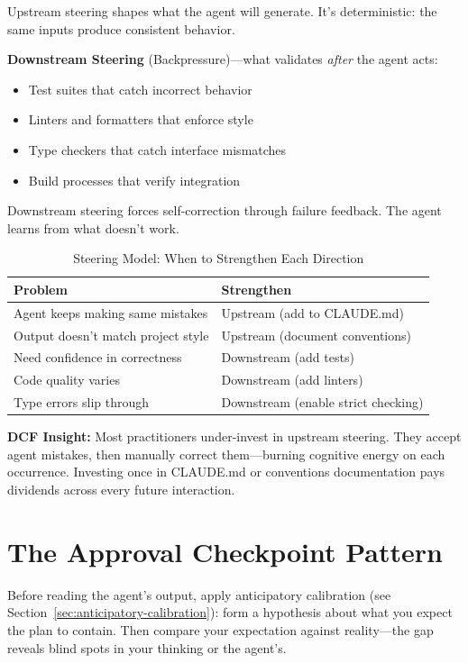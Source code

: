 Upstream steering shapes what the agent will generate. It's deterministic: the same inputs produce consistent behavior.

\textbf{Downstream Steering} (Backpressure)---what validates \emph{after} the agent acts:
\begin{itemize}
    \item Test suites that catch incorrect behavior
    \item Linters and formatters that enforce style
    \item Type checkers that catch interface mismatches
    \item Build processes that verify integration
\end{itemize}

Downstream steering forces self-correction through failure feedback. The agent learns from what doesn't work.

\begin{table}[H]
\centering
\begin{tabular}{ll}
\toprule
\textbf{Problem} & \textbf{Strengthen} \\
\midrule
Agent keeps making same mistakes & Upstream (add to CLAUDE.md) \\
Output doesn't match project style & Upstream (document conventions) \\
Need confidence in correctness & Downstream (add tests) \\
Code quality varies & Downstream (add linters) \\
Type errors slip through & Downstream (enable strict checking) \\
\bottomrule
\end{tabular}
\caption{Steering Model: When to Strengthen Each Direction}
\label{tab:steering-model}
\end{table}

\textbf{DCF Insight:} Most practitioners under-invest in upstream steering. They accept agent mistakes, then manually correct them---burning cognitive energy on each occurrence. Investing once in CLAUDE.md or conventions documentation pays dividends across every future interaction.

\section{The Approval Checkpoint Pattern}

Before reading the agent's output, apply anticipatory calibration (see Section~\ref{sec:anticipatory-calibration}): form a hypothesis about what you expect the plan to contain. Then compare your expectation against reality---the gap reveals blind spots in your thinking or the agent's.

